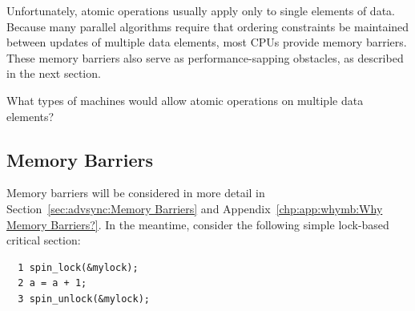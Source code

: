 Unfortunately, atomic operations usually apply only to single elements
of data.
Because many parallel algorithms require that ordering constraints
be maintained between updates of multiple data elements, most CPUs
provide memory barriers.
These memory barriers also serve as performance-sapping obstacles,
as described in the next section.

\QuickQuiz{}
	What types of machines would allow atomic operations on
	multiple data elements?
 \QuickQuizEnd

\subsection{Memory Barriers}
\label{sec:cpu:Memory Barriers}

Memory barriers will be considered in more detail in
Section~\ref{sec:advsync:Memory Barriers} and
Appendix~\ref{chp:app:whymb:Why Memory Barriers?}.
In the meantime, consider the following simple lock-based critical
section:

\vspace{5pt}
\begin{minipage}[t]{\columnwidth}
\small
\begin{verbatim}
  1 spin_lock(&mylock);
  2 a = a + 1;
  3 spin_unlock(&mylock);
\end{verbatim}
\end{minipage}
\vspace{5pt}

